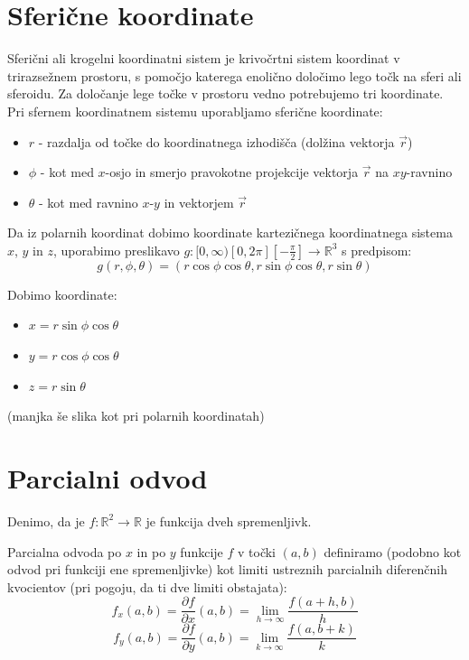 \documentclass[12pt, a4paper]{article}
\begin{document}
\section{Sferične koordinate}

Sferični ali krogelni koordinatni sistem je krivočrtni sistem koordinat v trirazsežnem prostoru, s pomočjo katerega enolično določimo lego točk na sferi ali sferoidu. Za določanje lege točke v prostoru vedno potrebujemo tri koordinate. Pri sfernem koordinatnem sistemu uporabljamo sferične koordinate:
\begin{itemize}
\item $r$ - razdalja od točke do koordinatnega izhodišča (dolžina vektorja $\vec{r}$)
\item $\phi$ - kot med $x$-osjo in smerjo pravokotne projekcije vektorja $\vec{r}$ na $xy$-ravnino
\item $\theta$ - kot med ravnino $x$-$y$ in vektorjem $\vec{r}$
\end{itemize}

Da iz polarnih koordinat dobimo koordinate kartezičnega koordinatnega sistema $x$, $y$ in $z$, uporabimo preslikavo $g:  [ 0,\infty)    [0,2\pi]    [-\frac{\pi}{2}]  \rightarrow \mathbb{R}^3 $ s predpisom:
$$g(r,\phi, \theta) = (r \cos \phi \cos \theta, r \sin \phi \cos \theta, r \sin \theta)$$

Dobimo koordinate:
\begin{itemize}
\item $x=r \sin \phi \cos \theta$
\item $y=r \cos \phi  \cos \theta $
\item $z=r \sin \theta$
\end{itemize}

(manjka še slika kot pri polarnih koordinatah)


\section{Parcialni odvod}


Denimo, da je $f : \mathbb{R}^2 \rightarrow \mathbb{R} $ je funkcija dveh spremenljivk.

Parcialna odvoda po $x$ in po $y$ funkcije $f$ v točki $(a, b)$ definiramo (podobno kot odvod pri funkciji ene spremenljivke) kot limiti ustreznih parcialnih diferenčnih kvocientov (pri pogoju, da ti dve limiti obstajata):
$$
f_x(a, b)= \frac{\partial f}{\partial x}(a, b) = \lim_{h\to\infty} \frac{f(a+h, b)}{h}
$$
$$
f_y(a, b)= \frac{\partial f}{\partial y}(a, b) = \lim_{k\to\infty} \frac{f(a, b+k)}{k}
$$
\end{document}
